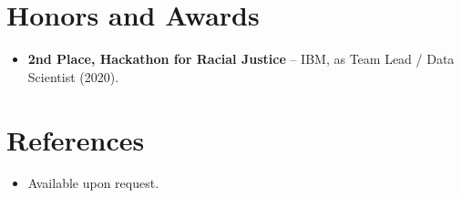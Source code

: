 \documentclass[11pt,a4paper,sans]{moderncv}
\begin{document}
\section{Honors and Awards}
\vspace{1pt}
\begin{itemize}
\item{\textbf{2nd Place, Hackathon for Racial Justice} -- IBM, as Team Lead / Data Scientist (2020).}
\end{itemize}


\section{References}
\vspace{1pt}
\begin{itemize}
\item{Available upon request.}
\end{itemize}
\end{document}
